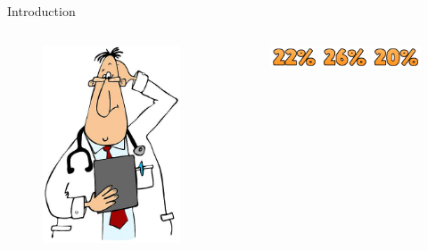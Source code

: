 \documentclass[10pt]{beamer}
\begin{document}
\begin{frame}{Introduction}{}
\begin{block}{}
\begin{columns}
{    	\begin{figure}
    		\centering
    		\includegraphics[scale=1]{AAUgraphics/confused.jpg}
    	\end{figure}
           
           \vspace{-0.8cm}
           
        \begin{figure}
        	
        	\centering
        	\includegraphics[width=\textwidth]{AAUgraphics/confstats.png}
        	\caption{}
        
        \end{figure}
    	}
    
       

\end{columns}
\end{block}
\end{frame}
\end{document}
